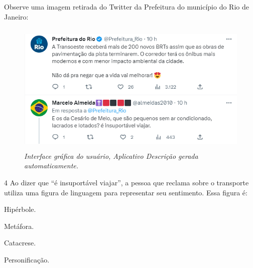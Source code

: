 Observe uma imagem retirada do Twitter da Prefeitura do
município do Rio de Janeiro:


\begin{figure}[H]
\centering\includegraphics[width=4.5in,height=2.5in]{./imgSAEB_6_POR/media/image6.png}
\caption{\tiny \emph{Interface gráfica do usuário, Aplicativo Descrição gerada
automaticamente.}}
\end{figure}



\num{4} Ao dizer que ``é insuportável viajar'', a pessoa que reclama sobre o
transporte utiliza uma figura de linguagem para representar seu
sentimento. Essa figura é:

\begin{escolha}
\item Hipérbole.
\item Metáfora.
\item Catacrese.
\item Personificação.
\end{escolha}



